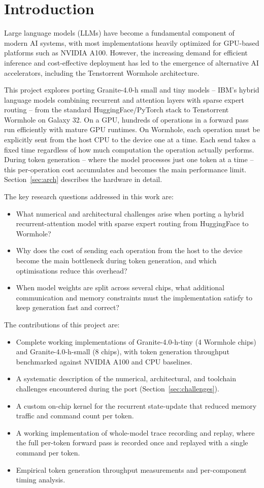\section{Introduction}

Large language models (LLMs) have become a fundamental component of modern AI systems, with most implementations heavily optimized for GPU-based platforms such as NVIDIA A100. However, the increasing demand for efficient inference and cost-effective deployment has led to the emergence of alternative AI accelerators, including the Tenstorrent Wormhole architecture.

This project explores porting Granite-4.0-h small and tiny models -- IBM's hybrid language models combining recurrent and attention layers with sparse expert routing -- from the standard HuggingFace/PyTorch stack to Tenstorrent Wormhole on Galaxy 32. On a GPU, hundreds of operations in a forward pass run efficiently with mature GPU runtimes. On Wormhole, each operation must be explicitly sent from the host CPU to the device one at a time. Each send takes a fixed time regardless of how much computation the operation actually performs. During token generation -- where the model processes just one token at a time -- this per-operation cost accumulates and becomes the main performance limit. Section~\ref{sec:arch} describes the hardware in detail.

The key research questions addressed in this work are:
\begin{itemize}
\item What numerical and architectural challenges arise when porting a hybrid recurrent-attention model with sparse expert routing from HuggingFace to Wormhole?
\item Why does the cost of sending each operation from the host to the device become the main bottleneck during token generation, and which optimisations reduce this overhead?
\item When model weights are split across several chips, what additional communication and memory constraints must the implementation satisfy to keep generation fast and correct?
\end{itemize}

The contributions of this project are:
\begin{itemize}
\item Complete working implementations of Granite-4.0-h-tiny (4 Wormhole chips) and Granite-4.0-h-small (8 chips), with token generation throughput benchmarked against NVIDIA A100 and CPU baselines.
\item A systematic description of the numerical, architectural, and toolchain challenges encountered during the port (Section~\ref{sec:challenges}).
\item A custom on-chip kernel for the recurrent state-update that reduced memory traffic and command count per token.
\item A working implementation of whole-model trace recording and replay, where the full per-token forward pass is recorded once and replayed with a single command per token.
\item Empirical token generation throughput measurements and per-component timing analysis.
\end{itemize}
